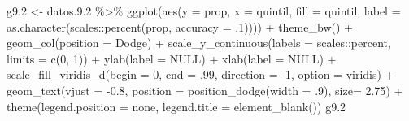 \documentclass[
  12pt,
]{book}
\newenvironment{Shaded}{\begin{snugshade}}{\end{snugshade}}
\newcommand{\AttributeTok}[1]{\textcolor[rgb]{0.77,0.63,0.00}{#1}}
\newcommand{\ConstantTok}[1]{\textcolor[rgb]{0.00,0.00,0.00}{#1}}
\newcommand{\DecValTok}[1]{\textcolor[rgb]{0.00,0.00,0.81}{#1}}
\newcommand{\FloatTok}[1]{\textcolor[rgb]{0.00,0.00,0.81}{#1}}
\newcommand{\FunctionTok}[1]{\textcolor[rgb]{0.00,0.00,0.00}{#1}}
\newcommand{\NormalTok}[1]{#1}
\newcommand{\OtherTok}[1]{\textcolor[rgb]{0.56,0.35,0.01}{#1}}
\newcommand{\SpecialCharTok}[1]{\textcolor[rgb]{0.00,0.00,0.00}{#1}}
\newcommand{\StringTok}[1]{\textcolor[rgb]{0.31,0.60,0.02}{#1}}
\begin{document}
\begin{Shaded}
\begin{Highlighting}[]
\NormalTok{g9}\FloatTok{.2} \OtherTok{\textless{}{-}} 
\NormalTok{  datos.}\FloatTok{9.2} \SpecialCharTok{\%\textgreater{}\%} 
  \FunctionTok{ggplot}\NormalTok{(}\FunctionTok{aes}\NormalTok{(}\AttributeTok{y =}\NormalTok{ prop, }\AttributeTok{x =}\NormalTok{ quintil, }\AttributeTok{fill =}\NormalTok{ quintil, }
             \AttributeTok{label =} \FunctionTok{as.character}\NormalTok{(scales}\SpecialCharTok{::}\FunctionTok{percent}\NormalTok{(prop, }\AttributeTok{accuracy =}\NormalTok{ .}\DecValTok{1}\NormalTok{)))) }\SpecialCharTok{+} 
  \FunctionTok{theme\_bw}\NormalTok{() }\SpecialCharTok{+} 
  \FunctionTok{geom\_col}\NormalTok{(}\AttributeTok{position =} \StringTok{\textquotesingle{}Dodge\textquotesingle{}}\NormalTok{) }\SpecialCharTok{+}
  \FunctionTok{scale\_y\_continuous}\NormalTok{(}\AttributeTok{labels =}\NormalTok{ scales}\SpecialCharTok{::}\NormalTok{percent,}
                      \AttributeTok{limits =} \FunctionTok{c}\NormalTok{(}\DecValTok{0}\NormalTok{, }\DecValTok{1}\NormalTok{)) }\SpecialCharTok{+}
  \FunctionTok{ylab}\NormalTok{(}\AttributeTok{label =} \ConstantTok{NULL}\NormalTok{) }\SpecialCharTok{+}
  \FunctionTok{xlab}\NormalTok{(}\AttributeTok{label =} \ConstantTok{NULL}\NormalTok{) }\SpecialCharTok{+}
  \FunctionTok{scale\_fill\_viridis\_d}\NormalTok{(}\AttributeTok{begin =} \DecValTok{0}\NormalTok{, }\AttributeTok{end =}\NormalTok{ .}\DecValTok{99}\NormalTok{, }\AttributeTok{direction =} \SpecialCharTok{{-}}\DecValTok{1}\NormalTok{, }\AttributeTok{option =} \StringTok{\textquotesingle{}viridis\textquotesingle{}}\NormalTok{) }\SpecialCharTok{+}
  \FunctionTok{geom\_text}\NormalTok{(}\AttributeTok{vjust =} \SpecialCharTok{{-}}\FloatTok{0.8}\NormalTok{,}
            \AttributeTok{position =} \FunctionTok{position\_dodge}\NormalTok{(}\AttributeTok{width =}\NormalTok{ .}\DecValTok{9}\NormalTok{),}
            \AttributeTok{size=} \FloatTok{2.75}\NormalTok{) }\SpecialCharTok{+} 
  \FunctionTok{theme}\NormalTok{(}\AttributeTok{legend.position =} \StringTok{\textquotesingle{}none\textquotesingle{}}\NormalTok{,}
        \AttributeTok{legend.title =} \FunctionTok{element\_blank}\NormalTok{())}
\NormalTok{g9}\FloatTok{.2}
\end{Highlighting}
\end{Shaded}
\end{document}
